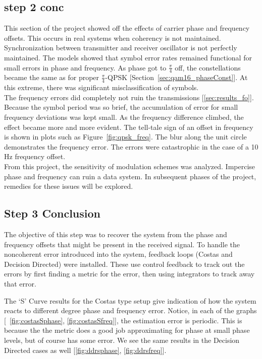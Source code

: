 \documentclass[]{article}
\begin{document}
\subsection{step 2 conc}
This section of the project showed off the effects of carrier phase and frequency offsets.  This occurs in real systems when coherency is not maintained.  Synchronization between transmitter and receiver oscillator is not perfectly maintained.  The models showed that symbol error rates remained functional for small errors in phase and frequency.  As phase got to $\frac{\pi}{4}$ off, the constellations became the same as for proper $\frac{\pi}{4}$-QPSK [Section~\ref{sec:qam16_phaseConst}].  At this extreme, there was significant misclassification of symbols.  \\

The frequency errors did completely not ruin the transmissions [\ref{sec:results_fo}].  Because the symbol period was so brief, the accumulation of error for small frequency deviations was kept small.  As the frequency difference climbed, the effect became more and more evident.  The tell-tale sign of an offset in frequency is shown in plots such as Figure~\ref{fig:qpsk_freq}.  The blur along the unit circle demonstrates the frequency error.  The errors were catastrophic in the case of a 10 Hz frequency offset.  \\

From this project, the sensitivity of modulation schemes was analyzed.  Impercise phase and frequency can ruin a data system.  In subsequent phases of the project, remedies for these issues will be explored.



\subsection{Step 3 Conclusion}
\label{sec:conc}

The objective of this step was to recover the system from the phase and frequency offsets that might be present in the received signal. To handle the noncoherent error introduced into the system, feedback loops (Costas and Decision Directed) were installed. These use control feedback to track out the errors by first finding a metric for the error, then using integrators to track away that error. 

The `S' Curve results for the Costas type setup give indication of how the system reacts to different degree phase and frequency error.  Notice, in each of the graphs [~\ref{fig:costasSphase}, \ref{fig:costasSfreq}], the estimation error is periodic.  This is because the the metric does a good job approximating for phase at small phase levels, but of course has some error.  We see the same results in the Decision Directed cases as well [\ref{fig:ddrsphase}, \ref{fig:ddrsfreq}].
\end{document}
